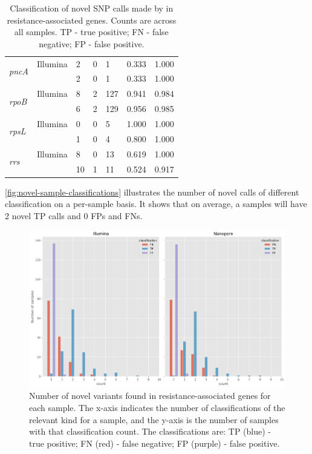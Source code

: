 \begin{table}
\begin{tabular}{@{}lllllll@{}}
\multirow{2}{*}{\textit{pncA}}  & Illumina   & 2  & 0  & 1   & 0.333  & 1.000     \\
                                & \ont{}     & 2  & 0  & 1   & 0.333  & 1.000     \\ \cmidrule(l){2-7}
\multirow{2}{*}{\textit{rpoB}}  & Illumina   & 8  & 2  & 127 & 0.941  & 0.984     \\
                                & \ont{}     & 6  & 2  & 129 & 0.956  & 0.985     \\ \cmidrule(l){2-7}
\multirow{2}{*}{\textit{rpsL}}  & Illumina   & 0  & 0  & 5   & 1.000  & 1.000     \\
                                & \ont{}     & 1  & 0  & 4   & 0.800  & 1.000     \\ \cmidrule(l){2-7}
\multirow{2}{*}{\textit{rrs}}   & Illumina   & 8  & 0  & 13  & 0.619  & 1.000     \\
                                & \ont{}     & 10 & 1  & 11  & 0.524  & 0.917     \\ \cmidrule(l){2-7} 
\end{tabular}
\caption{Classification of novel SNP calls made by \drprg{} in resistance-associated genes. Counts are across all samples. TP - true positive; FN - false negative; FP - false positive.}
\label{tab:novel-classifications}
\end{table}

\autoref{fig:novel-sample-classifications} illustrates the number of novel calls of different classification on a per-sample basis. It shows that on average, a samples will have 2 novel TP calls and 0 FPs and FNs. 

\begin{figure}
\begin{center}
\includegraphics[width=0.90\columnwidth]{Chapter3/Figs/novel_classifications_per_sample.png}
\caption{{Number of novel variants found in resistance-associated genes for each sample. The x-axis indicates the number of classifications of the relevant kind for a sample, and the y-axis is the number of samples with that classification count. The classifications are: TP (blue) - true positive; FN (red) - false negative; FP (purple) - false positive.
{\label{fig:novel-sample-classifications}}
}}
\end{center}
\end{figure}

